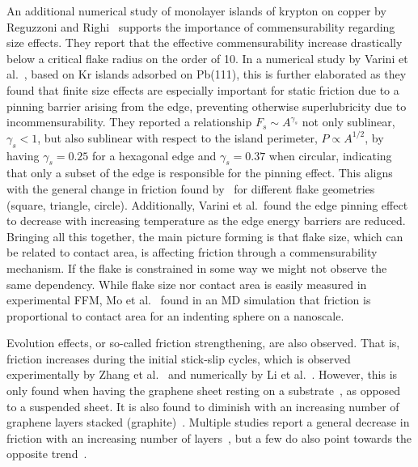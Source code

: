 An additional numerical study of monolayer islands of krypton on copper by
Reguzzoni and Righi~\cite{PhysRevB.85.201412} supports the importance of
commensurability regarding size effects. They report that the effective
commensurability increase drastically below a critical flake radius on the order
of \SI{10}{}. In a numerical study by Varini et al.~\cite{Varini_2015},
based on Kr islands adsorbed on Pb(111), this is further elaborated as they
found that finite size effects are especially important for static friction due
to a pinning barrier arising from the edge, preventing otherwise superlubricity
due to incommensurability. They reported a relationship $F_s \sim A^{\gamma_s}$
not only sublinear, $\gamma_s < 1$, but also sublinear with respect to the
island perimeter, $P \propto A^{1/2}$, by having $\gamma_s = 0.25$ for a
hexagonal edge and $\gamma_s = 0.37$ when circular, indicating that only a
subset of the edge is responsible for the pinning effect. This aligns with the
general change in friction found by~\cite{zhu_study_2018} for different flake
geometries (square, triangle, circle). Additionally, Varini et al.\ found the
edge pinning effect to decrease with increasing temperature as the edge energy
barriers are reduced. Bringing all this together, the main picture forming is
that flake size, which can be related to contact area, is affecting friction
through a commensurability mechanism. If the flake is constrained in some way we
might not observe the same dependency. While flake size nor contact area is
easily measured in experimental \acrshort{FFM}, Mo et
al.~\cite{mo_friction_2009} found in an \acrshort{MD} simulation that friction
is proportional to contact area for an indenting sphere on a nanoscale.


Evolution effects, or so-called friction strengthening, are also observed. That
is, friction increases during the initial stick-slip cycles, which is observed
experimentally by Zhang et al.~\cite{zhang_tuning_2019} and numerically by Li
et al.~\cite{li_evolving_2016}. However, this is only found when having the
graphene sheet resting on a substrate~\cite{zhang_tuning_2019}, as opposed to a
suspended sheet. It is also found to diminish with an increasing number of
graphene layers stacked (graphite)~\cite{li_evolving_2016}. Multiple studies report a general decrease in friction with an increasing number of layers~\cite{li_evolving_2016, Yoon2015MolecularDS, Paolicelli_2015, Filleter_2009, Lee_2010}, but a few do also point towards the opposite trend~\cite{Reguzzoni_2012}.


